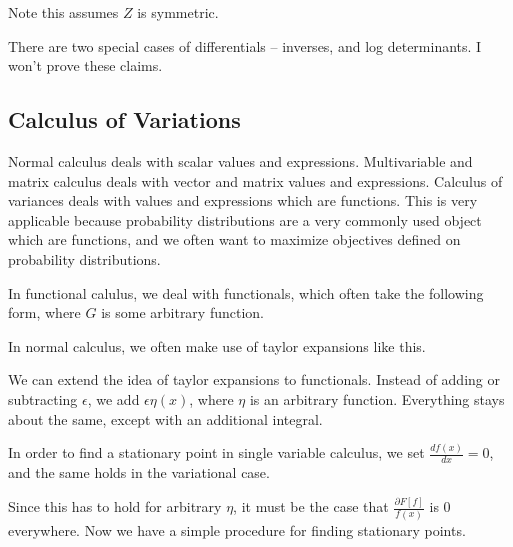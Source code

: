 \documentclass[12pt]{article}
\begin{document}
Note this assumes $Z$ is symmetric.

There are two special cases of differentials -- inverses, and log determinants. I won't prove these claims.


\subsection{Calculus of Variations}

Normal calculus deals with scalar values and expressions. Multivariable and matrix calculus deals with vector and matrix values and expressions. Calculus of variances deals with values and expressions which are functions. This is very applicable because probability distributions are a very commonly used object which are functions, and we often want to maximize objectives defined on probability distributions.

In functional calulus, we deal with functionals, which often take the following form, where $G$ is some arbitrary function.


In normal calculus, we often make use of taylor expansions like this.


We can extend the idea of taylor expansions to functionals. Instead of adding or subtracting $\epsilon$, we add $\epsilon \eta(x)$, where $\eta$ is an arbitrary function. Everything stays about the same, except with an additional integral. 


In order to find a stationary point in single variable calculus, we set $\frac{df(x)}{dx} = 0$, and the same holds in the variational case.


Since this has to hold for arbitrary $\eta$, it must be the case that $\frac{\partial F[f]}{f(x)}$ is 0 everywhere. Now we have a simple procedure for finding stationary points.

\end{document}
